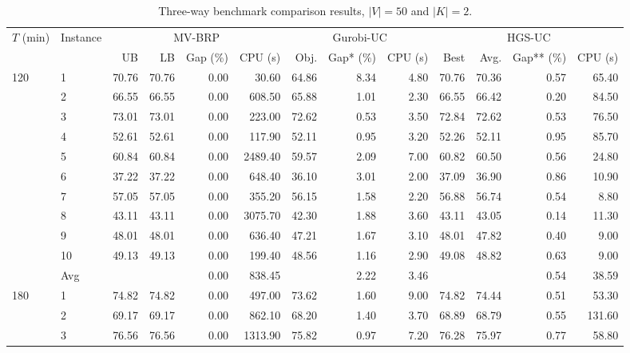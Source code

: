 \documentclass[11pt]{article}
\numberwithin{table}{section}
\numberwithin{figure}{section}
\begin{document}
\begin{landscape}
\begin{table}[p]
\centering
\caption{Three-way benchmark comparison results, $\mid V\mid =50$ and $\left| K \right|=2$.}
\label{tab:benchmark-50}
\scriptsize
\setlength{\tabcolsep}{3pt}
\begin{adjustbox}{max width=\linewidth}
\begin{tabular}{llrrrrrrr rrrr}
\toprule
\multirow{2}{*}{$T$ (min)} & \multirow{2}{*}{Instance} & \multicolumn{4}{c}{MV-BRP} & \multicolumn{3}{c}{Gurobi-UC} & \multicolumn{4}{c}{HGS-UC} \\
\cmidrule(lr){3-6}\cmidrule(lr){7-9}\cmidrule(lr){10-13}
& & UB & LB & Gap (\%) & CPU (s) & Obj. & Gap* (\%) & CPU (s) & Best & Avg. & Gap** (\%) & CPU (s) \\
\midrule
120 & 1 & 70.76 & 70.76 & 0.00 & 30.60 & 64.86 & 8.34 & 4.80 & 70.76 & 70.36 & 0.57 & 65.40 \\
 & 2 & 66.55 & 66.55 & 0.00 & 608.50 & 65.88 & 1.01 & 2.30 & 66.55 & 66.42 & 0.20 & 84.50 \\
 & 3 & 73.01 & 73.01 & 0.00 & 223.00 & 72.62 & 0.53 & 3.50 & 72.84 & 72.62 & 0.53 & 76.50 \\
 & 4 & 52.61 & 52.61 & 0.00 & 117.90 & 52.11 & 0.95 & 3.20 & 52.26 & 52.11 & 0.95 & 85.70 \\
 & 5 & 60.84 & 60.84 & 0.00 & 2489.40 & 59.57 & 2.09 & 7.00 & 60.82 & 60.50 & 0.56 & 24.80 \\
 & 6 & 37.22 & 37.22 & 0.00 & 648.40 & 36.10 & 3.01 & 2.00 & 37.09 & 36.90 & 0.86 & 10.90 \\
 & 7 & 57.05 & 57.05 & 0.00 & 355.20 & 56.15 & 1.58 & 2.20 & 56.88 & 56.74 & 0.54 & 8.80 \\
 & 8 & 43.11 & 43.11 & 0.00 & 3075.70 & 42.30 & 1.88 & 3.60 & 43.11 & 43.05 & 0.14 & 11.30 \\
 & 9 & 48.01 & 48.01 & 0.00 & 636.40 & 47.21 & 1.67 & 3.10 & 48.01 & 47.82 & 0.40 & 9.00 \\
 & 10 & 49.13 & 49.13 & 0.00 & 199.40 & 48.56 & 1.16 & 2.90 & 49.08 & 48.82 & 0.63 & 9.00 \\
\midrule
 & Avg &  &  & 0.00 & 838.45 &  & 2.22 & 3.46 &  &  & 0.54 & 38.59 \\
180 & 1 & 74.82 & 74.82 & 0.00 & 497.00 & 73.62 & 1.60 & 9.00 & 74.82 & 74.44 & 0.51 & 53.30 \\
 & 2 & 69.17 & 69.17 & 0.00 & 862.10 & 68.20 & 1.40 & 3.70 & 68.89 & 68.79 & 0.55 & 131.60 \\
 & 3 & 76.56 & 76.56 & 0.00 & 1313.90 & 75.82 & 0.97 & 7.20 & 76.28 & 75.97 & 0.77 & 58.80 \\

\end{tabular}
\end{adjustbox}
\end{table}
\end{landscape}
\end{document}

